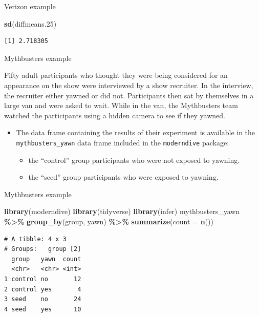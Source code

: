 \documentclass[
  ignorenonframetext,
]{beamer}
\newenvironment{Shaded}{\begin{snugshade}}{\end{snugshade}}
\newcommand{\AttributeTok}[1]{\textcolor[rgb]{0.13,0.29,0.53}{#1}}
\newcommand{\FloatTok}[1]{\textcolor[rgb]{0.00,0.00,0.81}{#1}}
\newcommand{\FunctionTok}[1]{\textcolor[rgb]{0.13,0.29,0.53}{\textbf{#1}}}
\newcommand{\NormalTok}[1]{#1}
\newcommand{\SpecialCharTok}[1]{\textcolor[rgb]{0.81,0.36,0.00}{\textbf{#1}}}
\providecommand{\tightlist}{%
  \setlength{\itemsep}{0pt}\setlength{\parskip}{0pt}}
\begin{document}
\begin{frame}[fragile]{Verizon example}
\begin{Shaded}
\begin{Highlighting}[]
\FunctionTok{sd}\NormalTok{(diffmeans}\FloatTok{.25}\NormalTok{)}
\end{Highlighting}
\end{Shaded}

\begin{verbatim}
[1] 2.718305
\end{verbatim}

\normalsize
\end{frame}

\begin{frame}[fragile]{Mythbusters example}
\protect\hypertarget{mythbusters-example}{}
\begin{tcolorbox}
Fifty adult participants who thought they were being considered for an appearance on the show were interviewed by a show recruiter. In the interview, the recruiter either yawned or did not. Participants then sat by themselves in a large van and were asked to wait. While in the van, the Mythbusters team watched the participants using a hidden camera to see if they yawned. 
\end{tcolorbox}

\begin{itemize}
\item
  The data frame containing the results of their experiment is available
  in the \texttt{mythbusters\_yawn} data frame included in the
  \texttt{moderndive} package:

  \begin{itemize}
  \tightlist
  \item
    the ``control'' group participants who were not exposed to yawning.
  \item
    the ``seed'' group participants who were exposed to yawning.
  \end{itemize}
\end{itemize}
\end{frame}

\begin{frame}[fragile]{Mythbusters example}
\protect\hypertarget{mythbusters-example-1}{}
\tiny

\begin{Shaded}
\begin{Highlighting}[]
\FunctionTok{library}\NormalTok{(moderndive)}
\FunctionTok{library}\NormalTok{(tidyverse)}
\FunctionTok{library}\NormalTok{(infer)}
\NormalTok{mythbusters\_yawn }\SpecialCharTok{\%\textgreater{}\%} 
  \FunctionTok{group\_by}\NormalTok{(group, yawn) }\SpecialCharTok{\%\textgreater{}\%} 
  \FunctionTok{summarize}\NormalTok{(}\AttributeTok{count =} \FunctionTok{n}\NormalTok{())}
\end{Highlighting}
\end{Shaded}

\begin{verbatim}
# A tibble: 4 x 3
# Groups:   group [2]
  group   yawn  count
  <chr>   <chr> <int>
1 control no       12
2 control yes       4
3 seed    no       24
4 seed    yes      10
\end{verbatim}

\normalsize
\end{frame}
\end{document}

